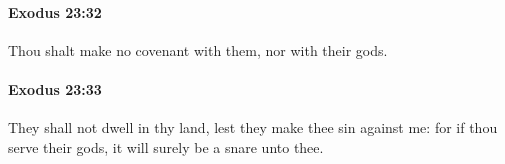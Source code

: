 		\paragraph{Exodus 23:32} %
			\label{EXODUS-23-32}

			Thou shalt make no covenant with them, nor with their gods.


		\paragraph{Exodus 23:33} %
			\label{EXODUS-23-33}

			They shall not dwell in thy land, lest they make thee sin against me: for if thou serve their gods, it will surely be a snare unto thee.

